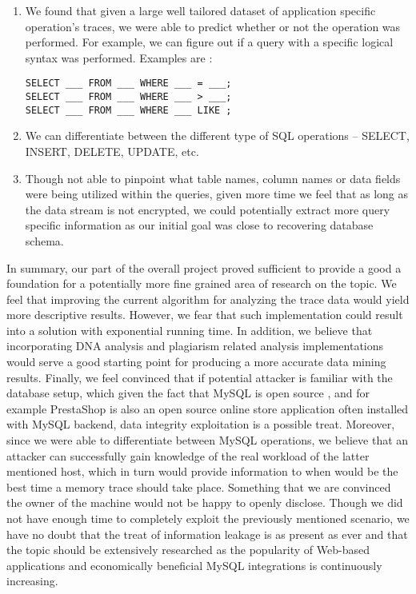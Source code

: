 \documentclass[11pt,a4paper, titlepage, oneside]{article}
\begin{document}
\begin{enumerate}
\item We found that given a large well tailored dataset of application specific operation's traces, we were able to predict whether or not the operation was performed. For example, we can figure out if a query with a specific logical syntax was performed. Examples are :
\begin{lstlisting}
SELECT ___ FROM ___ WHERE ___ = ___; 
SELECT ___ FROM ___ WHERE ___ > ___;
SELECT ___ FROM ___ WHERE ___ LIKE ;
\end{lstlisting}
\item We can differentiate between the different type of SQL operations – SELECT, INSERT, DELETE, UPDATE, etc.
      
\item Though not able to pinpoint what table names, column names or data fields were being utilized within the queries, given more time we feel that as long as the data stream is not encrypted, we could potentially extract more query specific information as our initial goal was close to recovering database schema.
\end{enumerate}

In summary, our part of the overall project proved sufficient to provide a good a foundation for a potentially more fine grained area of research on the topic. We feel that improving the current algorithm for analyzing the trace data would yield more descriptive results. However, we fear that such implementation could result into a solution with exponential running time. In addition, we believe that incorporating DNA analysis and plagiarism related analysis implementations would serve a good starting point for producing a more accurate data mining results. Finally, we feel convinced that if potential attacker is familiar with the database setup, which given the fact that MySQL is open source , and for example PrestaShop is also an open source online store application often installed with MySQL backend, data integrity exploitation is a possible treat. Moreover, since we were able to differentiate between MySQL operations, we believe that an attacker can successfully gain knowledge of the real workload of the latter mentioned host, which in turn would provide information to when would be the best time a memory trace should take place. Something that we are convinced the owner of the machine would not be happy to openly disclose. Though we did not have enough time to completely exploit the previously mentioned scenario, we have no doubt that the treat of information leakage is as present as ever and that the topic should be extensively researched as the popularity of Web-based applications and economically beneficial MySQL integrations is continuously increasing.
\end{document}
